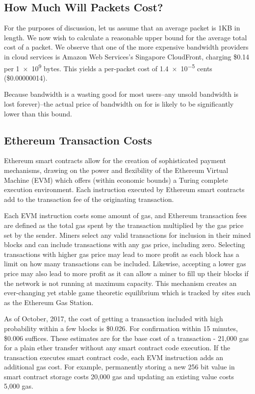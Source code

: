 \subsection{How Much Will Packets Cost?}
\label{packet_cost}

For the purposes of discussion, let us assume that an average packet is 1KB in length. We now wish to calculate a reasonable upper bound for the average total cost of a packet. We observe that one of the more expensive bandwidth providers in cloud services is Amazon Web Services's Singapore CloudFront, charging \$0.14 per \num{1e9} bytes. This yields a per-packet cost of \num{1.4e-5} cents (\$0.00000014). 

Because bandwidth is a wasting good for most users--any unsold bandwidth is lost forever)--the actual price of bandwidth on for \tOM{} is likely to be significantly lower than this bound.

\subsection{Ethereum Transaction Costs}

Ethereum smart contracts allow for the creation of sophisticated payment mechanisms, drawing on the power and flexibility of the Ethereum Virtual Machine\cite{ETHSpec} (EVM) which offers (within economic bounds) a Turing complete execution environment. Each instruction executed by Ethereum smart contracts add to the transaction fee of the originating transaction.

Each EVM instruction costs some amount of gas, and Ethereum transaction fees are defined as the total gas spent by the transaction multiplied by the gas price set by the sender. Miners select any valid transactions for inclusion in their mined blocks and can include transactions with any gas price, including zero. Selecting transactions with higher gas price may lead to more profit as each block has a limit on how many transactions can be included. Likewise, accepting a lower gas price may also lead to more profit as it can allow a miner to fill up their blocks if the network is not running at maximum capacity. This mechanism creates an ever-changing yet stable game theoretic equilibrium which is tracked by sites such as the Ethereum Gas Station\cite{ETHGas}.

As of October, 2017, the cost of getting a transaction included with high probability within a few blocks is \$0.026. For confirmation within 15 minutes, \$0.006 suffices. These estimates are for the base cost of a transaction - 21,000 gas for a plain ether transfer without any smart contract code execution. If the transaction executes smart contract code, each EVM instruction adds an additional gas cost. For example, permanently storing a new 256 bit value in smart contract storage costs 20,000 gas and updating an existing value costs 5,000 gas.

